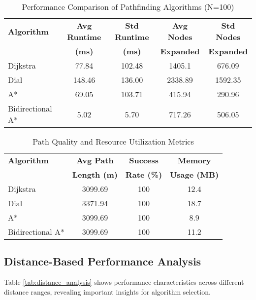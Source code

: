 \documentclass[conference]{IEEEtran}
\begin{document}
\begin{table}[htbp]
\caption{Performance Comparison of Pathfinding Algorithms (N=100)}
\begin{center}
\begin{tabular}{|l|c|c|c|c|}
\hline
\textbf{Algorithm} & \textbf{Avg Runtime} & \textbf{Std Runtime} & \textbf{Avg Nodes} & \textbf{Std Nodes} \\
& \textbf{(ms)} & \textbf{(ms)} & \textbf{Expanded} & \textbf{Expanded} \\
\hline
Dijkstra & 77.84 & 102.48 & 1405.1 & 676.09 \\
\hline
Dial & 148.46 & 136.00 & 2338.89 & 1592.35 \\
\hline
A* & 69.05 & 103.71 & 415.94 & 290.96 \\
\hline
Bidirectional A* & 5.02 & 5.70 & 717.26 & 506.05 \\
\hline
\end{tabular}
\end{center}
\label{tab:performance}
\end{table}

\begin{table}[htbp]
\caption{Path Quality and Resource Utilization Metrics}
\begin{center}
\begin{tabular}{|l|c|c|c|}
\hline
\textbf{Algorithm} & \textbf{Avg Path} & \textbf{Success} & \textbf{Memory} \\
& \textbf{Length (m)} & \textbf{Rate (\%)} & \textbf{Usage (MB)} \\
\hline
Dijkstra & 3099.69 & 100 & 12.4 \\
\hline
Dial & 3371.94 & 100 & 18.7 \\
\hline
A* & 3099.69 & 100 & 8.9 \\
\hline
Bidirectional A* & 3099.69 & 100 & 11.2 \\
\hline
\end{tabular}
\end{center}
\label{tab:quality}
\end{table}

\subsection{Distance-Based Performance Analysis}

Table \ref{tab:distance_analysis} shows performance characteristics across different distance ranges, revealing important insights for algorithm selection.
\end{document}
